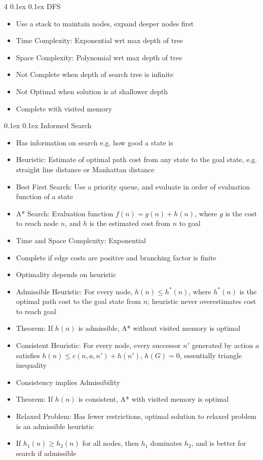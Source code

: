 \documentclass[10pt, landscape]{article}
\makeatletter
\renewcommand{\section}{\@startsection{section}{1}{0mm}%
  {0.1ex} %
  {0.1ex} %
  {\normalfont\large\bfseries}}
\renewcommand{\subsection}{\@startsection{subsection}{2}{0mm}%
  {0.1ex} %
  {0.1ex} %
  {\normalfont\normalsize\bfseries}}
\makeatother
\begin{document}
\begin{multicols*}{4}
\subsection{DFS}
\begin{itemize}
    \item Use a stack to maintain nodes, expand deeper nodes first
    \item Time Complexity: Exponential wrt max depth of tree
    \item Space Complexity: Polynomial wrt max depth of tree
    \item Not Complete when depth of search tree is infinite
    \item Not Optimal when solution is at shallower depth
    \item Complete with visited memory
\end{itemize}

\section{Informed Search}
\begin{itemize}
    \item Has information on search e.g. how good a state is
    \item Heuristic: Estimate of optimal path cost from any state to the goal state, e.g. straight line distance or Manhattan distance
    \item Best First Search: Use a priority queue, and evaluate in order of evaluation function of a state
    \item A* Search: Evaluation function $f(n)=g(n)+h(n)$, where $g$ is the cost to reach node $n$, and $h$ is the estimated cost from $n$ to goal
    \item Time and Space Complexity: Exponential
    \item Complete if edge costs are positive and branching factor is finite
    \item Optimality depends on heuristic
    \item Admissible Heuristic: For every node, $h(n) \leq h^*(n)$, where $h^*(n)$ is the optimal path cost to the goal state from $n$; heuristic never overestimates cost to reach goal
    \item Theorem: If $h(n)$ is admissible, A* without visited memory is optimal
    \item Consistent Heuristic: For every node, every successor $n'$ generated by action $a$ satisfies $h(n) \leq c(n,a,n')+h(n')$, $h(G)=0$, essentially triangle inequality
    \item Consistency implies Admissibility
    \item Theorem: If $h(n)$ is consistent, A* with visited memory is optimal
    \item Relaxed Problem: Has fewer restrictions, optimal solution to relaxed problem is an admissible heuristic
    \item If $h_1(n) \geq h_2(n)$ for all nodes, then $h_1$ dominates $h_2$, and is better for search if admissible
\end{itemize}


\end{multicols*}
\end{document}
